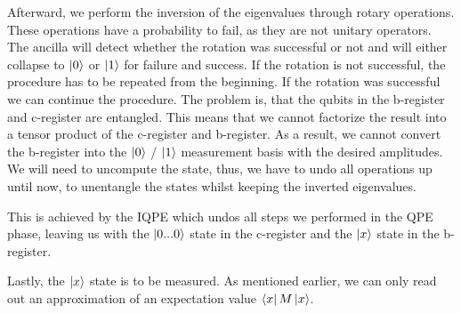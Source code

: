 Afterward, we perform the inversion of the eigenvalues through rotary operations. 
These operations have a probability to fail, as they are not unitary operators.
The ancilla will detect whether the rotation was successful or not and will either collapse to $\ket0$ or $\ket1$ for failure and success.
If the rotation is not successful, the procedure has to be repeated from the beginning. 
If the rotation was successful we can continue the procedure. 
The problem is, that the qubits in the b-register and c-register are entangled. 
This means that we cannot factorize the result into a tensor product of the c-register and b-register.
As a result, we cannot convert the b-register into the $\ket 0$ / $\ket 1$ measurement basis with the desired amplitudes.
We will need to uncompute the state, thus, we have to undo all operations up until now, to unentangle the states whilst keeping the inverted eigenvalues.

This is achieved by the IQPE which undos all steps we performed in the QPE phase, leaving us with the $\ket{0...0}$ state in the c-register and the $\ket x$ state in the b-register.

Lastly, the $\ket x$ state is to be measured. As mentioned earlier, we can only read out an approximation of an expectation value $\bra x M \ket x$.
